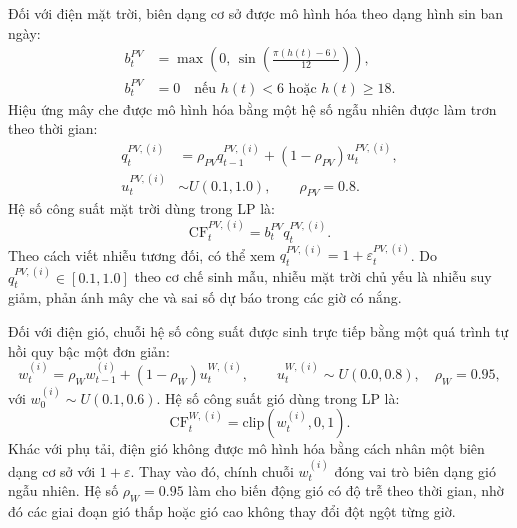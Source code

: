 Đối với điện mặt trời, biên dạng cơ sở được mô hình hóa theo dạng hình sin ban ngày:
\begin{equation}
    \begin{aligned}
    b_t^{PV}
    &=
    \max\left(0,\,
    \sin\left(\frac{\pi (h(t)-6)}{12}\right)
    \right),\\
    b_t^{PV}
    &=0 \quad \text{nếu } h(t)<6 \text{ hoặc } h(t)\ge 18.
    \end{aligned}
    \label{eq:mc_solar_base}
\end{equation}
Hiệu ứng mây che được mô hình hóa bằng một hệ số ngẫu nhiên được làm trơn theo thời gian:
\begin{equation}
    \begin{aligned}
    q_t^{PV,(i)}
    &=
    \rho_{PV} q_{t-1}^{PV,(i)}
    +
    (1-\rho_{PV}) u_t^{PV,(i)},\\
    u_t^{PV,(i)}
    &\sim U(0.1, 1.0),
    \qquad \rho_{PV}=0.8.
    \end{aligned}
    \label{eq:mc_solar_cloud}
\end{equation}
Hệ số công suất mặt trời dùng trong LP là:
\begin{equation}
    \mathrm{CF}_{t}^{PV,(i)}
    =
    b_t^{PV} q_t^{PV,(i)}.
    \label{eq:mc_solar_perturbation}
\end{equation}
Theo cách viết nhiễu tương đối, có thể xem $q_t^{PV,(i)} = 1 + \varepsilon_t^{PV,(i)}$. Do $q_t^{PV,(i)} \in [0.1,1.0]$ theo cơ chế sinh mẫu, nhiễu mặt trời chủ yếu là nhiễu suy giảm, phản ánh mây che và sai số dự báo trong các giờ có nắng.

Đối với điện gió, chuỗi hệ số công suất được sinh trực tiếp bằng một quá trình tự hồi quy bậc một đơn giản:
\begin{equation}
    w_t^{(i)}
    =
    \rho_W w_{t-1}^{(i)}
    +
    (1-\rho_W) u_t^{W,(i)},
    \qquad
    u_t^{W,(i)} \sim U(0.0, 0.8),
    \quad \rho_W=0.95,
    \label{eq:mc_wind_ar}
\end{equation}
với $w_0^{(i)} \sim U(0.1,0.6)$. Hệ số công suất gió dùng trong LP là:
\begin{equation}
    \mathrm{CF}_{t}^{W,(i)}
    =
    \mathrm{clip}\left(w_t^{(i)},0,1\right).
    \label{eq:mc_wind_perturbation}
\end{equation}
Khác với phụ tải, điện gió không được mô hình hóa bằng cách nhân một biên dạng cơ sở với $1+\varepsilon$. Thay vào đó, chính chuỗi $w_t^{(i)}$ đóng vai trò biên dạng gió ngẫu nhiên. Hệ số $\rho_W=0.95$ làm cho biến động gió có độ trễ theo thời gian, nhờ đó các giai đoạn gió thấp hoặc gió cao không thay đổi đột ngột từng giờ.

